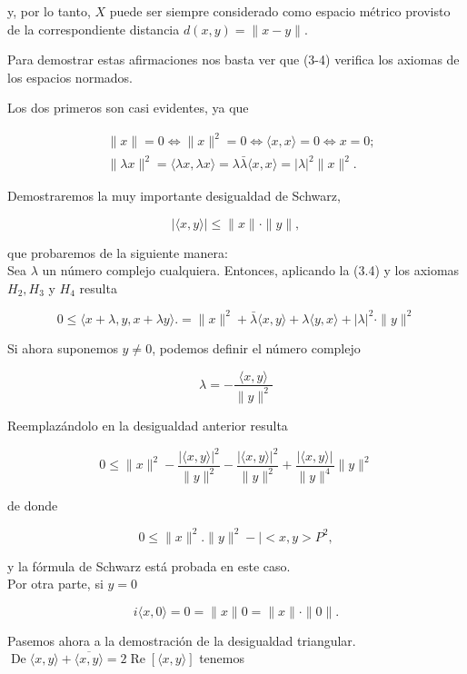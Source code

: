\documentclass[10pt]{article}
\theoremstyle{plain}
\theoremstyle{definition}
\theoremstyle{remark}
\begin{document}
y, por lo tanto, $X$ puede ser siempre considerado como espacio métrico provisto de la correspondiente distancia $d(x, y)=\|x-y\|$.

Para demostrar estas afirmaciones nos basta ver que (3-4) verifica los axiomas de los espacios normados.

Los dos primeros son casi evidentes, ya que

$$
\begin{aligned}
& \|x\|=0 \Longleftrightarrow\|x\|^{2}=0 \Longleftrightarrow\langle x, x\rangle=0 \Longleftrightarrow x=0 ; \\
& \|\lambda x\|^{2}=\langle\lambda x, \lambda x\rangle=\lambda \bar{\lambda}\langle x, x\rangle=|\lambda|^{2}\|x\|^{2} .
\end{aligned}
$$

Demostraremos la muy importante desigualdad de Schwarz,


\begin{equation*}
|\langle x, y\rangle| \leqslant\|x\| \cdot\|y\|, \tag{3-5}
\end{equation*}



que probaremos de la siguiente manera:\\
Sea $\lambda$ un número complejo cualquiera. Entonces, aplicando la (3.4) y los axiomas $H_{2}, H_{3}$ y $H_{4}$ resulta

$$
0 \leqslant\langle x+\lambda, y, x+\lambda y\rangle .=\|x\|^{2}+\bar{\lambda}\langle x, y\rangle+\lambda\langle y, x\rangle+|\lambda|^{2} \cdot\|y\|^{2}
$$

Si ahora suponemos $y \neq 0$, podemos definir el número complejo

$$
\lambda=-\frac{\langle x, y\rangle}{\|y\|^{2}}
$$

Reemplazándolo en la desigualdad anterior resulta

$$
0 \leqslant\|x\|^{2}-\frac{|\langle x, y\rangle|^{2}}{\|y\|^{2}}-\frac{|\langle x, y\rangle|^{2}}{\|y\|^{2}}+\frac{|\langle x, y\rangle|}{\|y\|^{4}}\|y\|^{2}
$$

de donde

$$
0 \leqslant\|x\|^{2} .\|y\|^{2}-\mid<x, y>P^{2},
$$

y la fórmula de Schwarz está probada en este caso.\\
Por otra parte, si $y=0$

$$
i\langle x, 0\rangle=0=\|x\| 0=\|x\| \cdot\|0\| .
$$

Pasemos ahora a la demostración de la desigualdad triangular.\\
$\operatorname{De}\langle x, y\rangle+\overline{\langle x, y\rangle}=2 \operatorname{Re}[\langle x, y\rangle]$ tenemos
\end{document}
